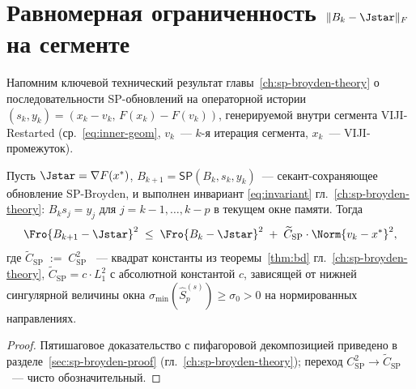 \section{Равномерная ограниченность $\|B_k - \Jstar\|_F$ на сегменте}
\label{sec:viji:sp-bd}

Напомним ключевой технический результат главы~\ref{ch:sp-broyden-theory}
о последовательности SP-обновлений на операторной истории
$(s_k, y_k) = (x_k - v_k,\, F(x_k) - F(v_k))$, генерируемой
внутри сегмента VIJI-Restarted (ср.~\eqref{eq:inner-geom},
$v_k$~--- $k$-я итерация сегмента, $x_k$~--- VIJI-промежуток).

\begin{theorem}
\label{thm:sp-bd}
Пусть $\Jstar = \nabla F(x^{*})$, $B_{k+1} = \mathsf{SP}(B_k, s_k, y_k)$~---
секант-сохраняющее обновление SP-Broyden, и выполнен инвариант
\eqref{eq:invariant} гл.~\ref{ch:sp-broyden-theory}: $B_k s_j = y_j$
для $j = k{-}1, \ldots, k{-}p$ в текущем окне памяти.
Тогда
\begin{equation}
\Fro{B_{k+1} - \Jstar}^2 \;\le\; \Fro{B_k - \Jstar}^2
\;+\; \widetilde C_{\mathrm{SP}} \cdot \Norm{v_k - x^{*}}^2,
\label{eq:sp-bd}
\end{equation}
где
\(
   \widetilde C_{\mathrm{SP}} \;:=\; C_{\mathrm{SP}}^2
\)
~--- квадрат константы из теоремы~\ref{thm:bd}
гл.~\ref{ch:sp-broyden-theory}, $\widetilde C_{\mathrm{SP}} = c \cdot L_1^2$
с абсолютной константой $c$, зависящей от нижней сингулярной величины
окна $\sigma_{\min}(\widehat S_p^{(s)}) \ge \sigma_0 > 0$ на нормированных
направлениях.
\end{theorem}

\begin{proof}
Пятишаговое доказательство с пифагоровой декомпозицией
приведено в разделе~\ref{sec:sp-broyden-proof} (гл.~\ref{ch:sp-broyden-theory});
переход $C_{\mathrm{SP}}^2 \to \widetilde C_{\mathrm{SP}}$~--- чисто
обозначительный.
\end{proof}

